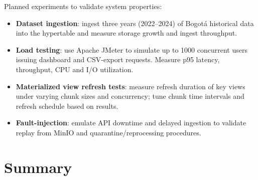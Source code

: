 Planned experiments to validate system properties:
\begin{itemize}
    \item \textbf{Dataset ingestion}: ingest three years (2022--2024) of Bogotá historical data into the hypertable and measure storage growth and ingest throughput.
    \item \textbf{Load testing}: use Apache JMeter to simulate up to 1000 concurrent users issuing dashboard and CSV-export requests. Measure p95 latency, throughput, CPU and I/O utilization.
    \item \textbf{Materialized view refresh tests}: measure refresh duration of key views under varying chunk sizes and concurrency; tune chunk time intervals and refresh schedule based on results.
    \item \textbf{Fault-injection}: emulate API downtime and delayed ingestion to validate replay from MinIO and quarantine/reprocessing procedures.
\end{itemize}

\section{Summary}

